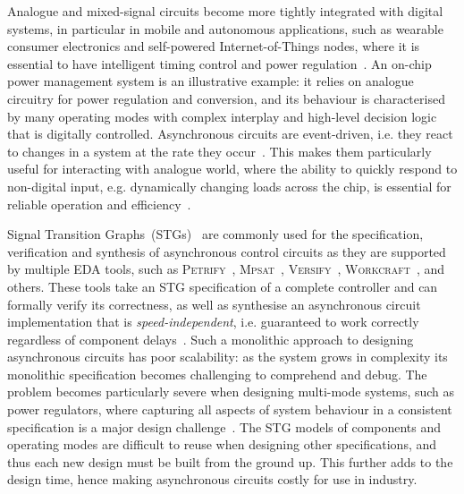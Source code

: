 \documentclass[british,compsoc]{IEEEtran}
\newcommand{\noun}[1]{\textsc{#1}}
\begin{document}
Analogue and mixed-signal circuits become more tightly integrated with
digital systems, in particular in mobile and autonomous applications,
such as wearable consumer electronics and self-powered Internet-of-Things
nodes, where it is essential to have intelligent timing control and power
regulation~\cite{7287733}\cite{talbot2016holistic}\cite{6241632}.
An on-chip power management system is an illustrative example: it relies
on analogue circuitry for power regulation and conversion, and its behaviour
is characterised by many operating modes with complex interplay and
high-level decision logic that is digitally controlled.
Asynchronous circuits are event-driven, i.e. they react to changes
in a system at the rate they occur~\cite{sparso2001principles}.
This makes them particularly useful for interacting with analogue world,
where the ability to quickly respond to non-digital input, e.g.
dynamically changing loads across the chip, is essential for reliable
operation and efficiency~\cite{2008_audy_isscc_tutorial}.

Signal Transition Graphs~(STGs)~\cite{Chu_1987_phd}\cite{Rosenblum_1985_tpn}
are commonly used for the specification,
verification and synthesis of asynchronous control circuits as they are
supported by multiple EDA tools, such as \noun{Petrify}~\cite{Cortadella},
\noun{Mpsat}~\cite{khomenko2004detecting}, \noun{Versify}~\cite{i1997formal},
\noun{Workcraft}~\cite{2007_poliakov_workcraft}\cite{Workcraft_website}, and others.
These tools take an STG specification of a complete controller and can
formally verify its correctness, as well as synthesise an asynchronous
circuit implementation that is \emph{speed-independent}, i.e. guaranteed
to work correctly regardless of component delays~\cite{Muller_1959_ts}.
Such a monolithic approach to designing asynchronous circuits has
poor scalability: as the system grows in complexity its monolithic
specification becomes challenging to comprehend and debug. The problem
becomes particularly severe when designing multi-mode systems, such as
power regulators, where capturing all aspects of system behaviour in a
consistent specification is a major design challenge~\cite{2014_sokolov_ftfc}\cite{sokolov2015design}.
The STG models of components and operating modes are difficult to reuse
when designing other specifications, and thus each new design must be built
from the ground up. This further adds to the design time, hence making
asynchronous circuits costly for use in industry.
\end{document}
